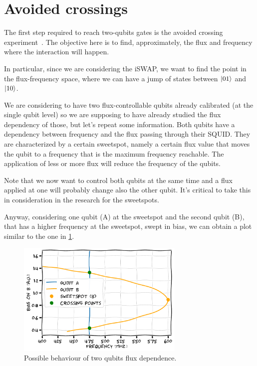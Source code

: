 \section{Avoided crossings}

The first step required to reach two-qubits gates is the avoided crossing experiment~\cite{Silveri2015, Sun2020}.
The objective here is to find, approximately, the flux and frequency where the interaction will happen.

In particular, since we are considering the iSWAP, we want to find the point in the flux-frequency space, where we can have a jump of states between $\ket{01}$ and $\ket{10}$.

We are considering to have two flux-controllable qubits already calibrated (at the single qubit level) so we are supposing to have already studied the flux dependency of those, but let's repeat some information.
Both qubits have a dependency between frequency and the flux passing through their SQUID.
They are characterized by a certain sweetspot, namely a certain flux value that moves the qubit to a frequency that is the maximum frequency reachable.
The application of less or more flux will reduce the frequency of the qubits.

Note that we now want to control both qubits at the same time and a flux applied at one will probably change also the other qubit. It's critical to take this in consideration in the research for the sweetspots.

Anyway, considering one qubit (A) at the sweetspot and the second qubit (B), that has a higher frequency at the sweetspot, swept in bias, we can obtain a plot similar to the one in \cref{fig:crossings}.

\begin{figure}[ht]
    \centering
    \includegraphics[width=8cm]{Two-qubits calibration/Figures/crossings.pdf}
    \caption{Possible behaviour of two qubits flux dependence.}
    \label{fig:crossings}
\end{figure}

